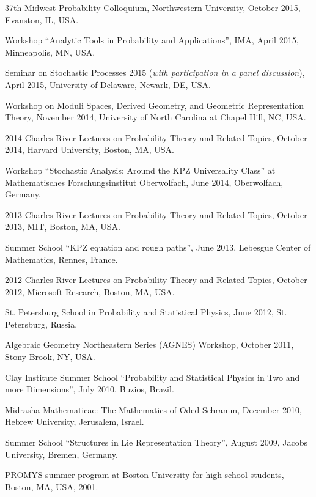 \documentclass[letterpaper,11pt]{article}
\begin{document}
\begin{etaremune}
\item 37th Midwest Probability Colloquium, Northwestern University, 
October 2015,
Evanston, IL, USA.

\item Workshop ``Analytic Tools in Probability and Applications'', IMA, April 2015, Minneapolis, MN, USA.

\item Seminar on Stochastic Processes 2015 (\emph{with participation in a panel discussion}), 
April 2015, University of Delaware, 
Newark, DE, USA.

\item Workshop on Moduli Spaces, Derived Geometry, and Geometric Representation Theory, November 2014, University of North Carolina at Chapel Hill, NC, USA.

\item 2014 Charles River Lectures on Probability Theory and Related Topics, 
October 2014, Harvard University, Boston, MA, USA.

\item Workshop ``Stochastic Analysis: Around the KPZ Universality Class'' at Mathematisches Forschungsinstitut Oberwolfach,
June 2014, Oberwolfach, Germany.

\item 2013 Charles River Lectures on Probability Theory and Related Topics, 
October 2013, MIT, Boston, MA, USA.

\item Summer School ``KPZ equation and rough paths'', 
June 2013, 
Lebesgue Center of Mathematics, Rennes, France.

\item 2012 Charles River Lectures on Probability Theory and Related Topics, 
October 2012, Microsoft Research, Boston, MA, USA.

\item St. Petersburg School in Probability and Statistical Physics, June 2012, St. Petersburg, Russia.

\item Algebraic Geometry Northeastern Series (AGNES) Workshop, 
October 2011,
Stony Brook, NY, USA.

\item Clay Institute Summer School ``Probability and Statistical Physics in Two and more Dimensions'', July 2010, Buzios, Brazil. 

\item Midrasha Mathematicae: The Mathematics of Oded Schramm, December 2010, Hebrew University, Jerusalem, Israel. 

\item Summer School ``Structures in Lie Representation Theory'', August 2009, Jacobs University, Bremen, Germany. 

\item PROMYS summer program at Boston University for high school students, Boston, MA, USA, 2001.
\end{etaremune}
\end{document}
